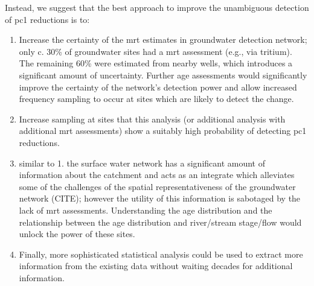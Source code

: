 Instead, we suggest that the best approach to improve the unambiguous detection of \gls{pc1} reductions is to:
\begin{enumerate}
    \item Increase the certainty of the \gls{mrt} estimates in groundwater detection network; only c. 30\% of groundwater sites had a \gls{mrt} assessment (e.g., via tritium).  The remaining 60\% were estimated from nearby wells, which introduces a significant amount of uncertainty. Further age assessments would significantly improve the certainty of the network's detection power and allow increased frequency sampling to occur at sites which are likely to detect the change.
    \item Increase sampling at sites that this analysis (or additional analysis with additional \gls{mrt} assessments) show a suitably high probability of detecting \gls{pc1} reductions. %
    \item similar to 1. the surface water network has a significant amount of information about the catchment and acts as an integrate which alleviates some of the challenges of the spatial representativeness of the groundwater network (CITE); however the utility of this information is sabotaged by the lack of \gls{mrt} assessments. Understanding the age distribution and the relationship between the age distribution and river/stream stage/flow would unlock the power of these sites.
    \item Finally, more sophisticated statistical analysis could be used to extract more information from the existing data without waiting decades for additional information.
\end{enumerate}